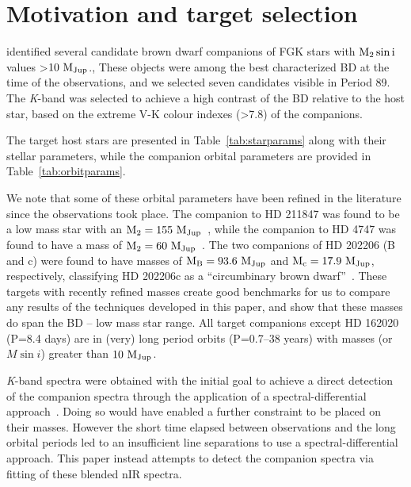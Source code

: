 \documentclass[fleqn,usenatbib]{mnras}
\newcommand*\bl{\color{blue}}
\begin{document}
    \section{Motivation and target selection}
    \label{sec:motivation}
    \citet{sahlmann_search_2011} identified several candidate brown dwarf companions of FGK stars with \(\rm M_2 \sin{i}\) values >\(\rm 10~M_{Jup}\).{\bl, These objects were among the best characterized BD at the time of the observations, and we selected seven candidates visible in Period 89. The \textit{K}-band was selected to achieve a high contrast of the BD relative to the host star,  based on the extreme V-K colour indexes (>7.8) of the companions}. 
    
    The target host stars are presented in Table~\ref{tab:starparams} along with their stellar parameters, while the companion orbital parameters are provided in Table~\ref{tab:orbitparams}.
    
    We note that some of these orbital parameters have been refined in the literature since the observations took place. The companion to {HD 211847} was found to be a low mass star with an \(\rm M_2=155~M_{Jup}\)~\citep{moutou_eccentricity_2017}, while the companion to {HD 4747} was found to have a mass of \(\rm M_2=60~M_{Jup}\)~\citep{crepp_trends_2016}. The two companions of {HD 202206} (B and c) were found to have masses of \(\rm M_B =93.6~M_{Jup}\) and \(\rm M_c = 17.9~M_{Jup}\), respectively, classifying {HD 202206}c as a ``circumbinary brown dwarf''~\citep{benedict_hd_2017}. These targets with recently refined masses create good benchmarks for us to compare any results of the techniques developed in this paper, and show that these masses do span the BD -- low mass star range. All target companions except {HD 162020} (P=8.4 days) are in (very) long period orbits (P=0.7--38 years) with masses (or \(M\sin{i}\)) greater than \(\rm 10~M_{Jup}\).
    
    {\bl \textit{K}-band spectra were obtained with the initial goal to achieve a direct detection of the companion spectra through the application of a spectral-differential approach~\citep[e.g.][]{ferluga_separating_1997, kostogryz_spectral_2013}. Doing so would have enabled a further constraint to be placed on their masses.  However the short time elapsed between observations and the long orbital periods led to an insufficient line separations to use a spectral-differential approach. This paper instead attempts to detect the companion spectra via fitting of these blended nIR spectra.}
    
\end{document}
